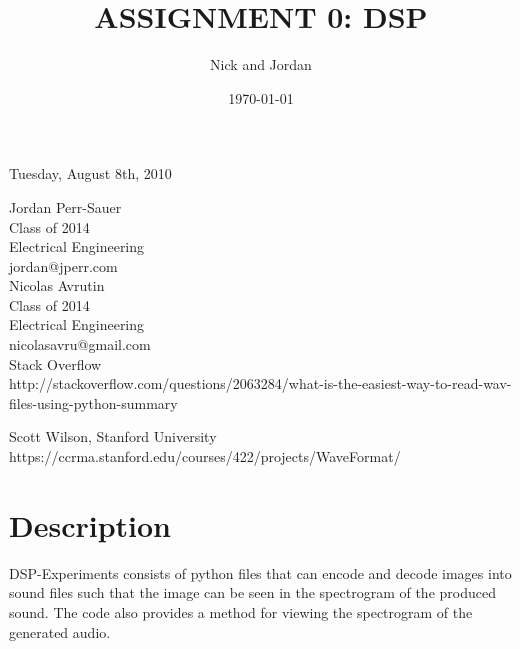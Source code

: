 \documentclass[12pt]{article}
\title{ASSIGNMENT 0: DSP}
\author{Nick and Jordan}
\date{\today}
\begin{document}
\maketitle
\thispagestyle{empty}
\vspace{1in}
\doublespacing

\pagebreak


Tuesday, August 8th, 2010


Jordan Perr-Sauer\\
Class of 2014\\
Electrical Engineering\\
jordan@jperr.com\\

Nicolas Avrutin\\
Class of 2014\\
Electrical Engineering\\
nicolasavru@gmail.com\\


Stack Overflow\\
http://stackoverflow.com/questions/2063284/what-is-the-easiest-way-to-read-wav-files-using-python-summary

Scott Wilson, Stanford University\\
https://ccrma.stanford.edu/courses/422/projects/WaveFormat/



\section{Description}

DSP-Experiments consists of python files that can encode and decode images into sound files such that the image can be seen in the spectrogram of the produced sound. The code also provides a method for viewing the spectrogram of the generated audio.
\end{document}
